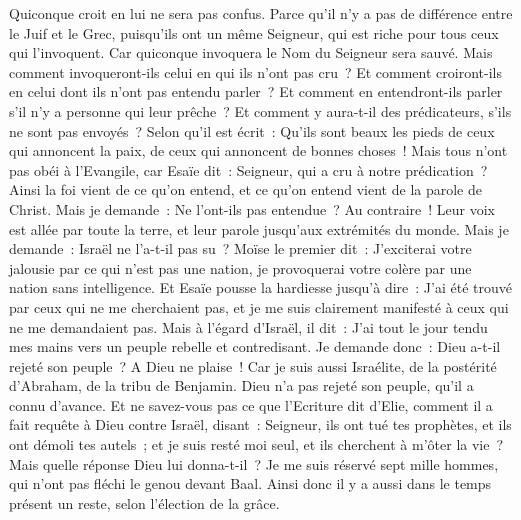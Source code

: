 \begin{multicols}{2}
Quiconque croit en lui ne sera pas confus.
Parce qu'il n'y a pas de différence entre le Juif et le Grec, puisqu'ils ont un même Seigneur, qui est riche pour tous ceux qui l'invoquent.
Car quiconque invoquera le Nom du Seigneur sera sauvé.
Mais comment invoqueront-ils celui en qui ils n'ont pas cru~? Et comment croiront-ils en celui dont ils n'ont pas entendu parler~? Et comment en entendront-ils parler s'il n'y a personne qui leur prêche~?
Et comment y aura-t-il des prédicateurs, s'ils ne sont pas envoyés~? Selon qu'il est écrit~: Qu'ils sont beaux les pieds de ceux qui annoncent la paix, de ceux qui annoncent de bonnes choses~!
Mais tous n'ont pas obéi à l'Evangile, car Esaïe dit~: Seigneur, qui a cru à notre prédication~?
Ainsi la foi vient de ce qu'on entend, et ce qu'on entend vient de la parole de Christ.
Mais je demande~: Ne l'ont-ils pas entendue~? Au contraire~! Leur voix est allée par toute la terre, et leur parole jusqu'aux extrémités du monde.
Mais je demande~: Israël ne l'a-t-il pas su~? Moïse le premier dit~: J'exciterai votre jalousie par ce qui n'est pas une nation, je provoquerai votre colère par une nation sans intelligence.
Et Esaïe pousse la hardiesse jusqu'à dire~: J'ai été trouvé par ceux qui ne me cherchaient pas, et je me suis clairement manifesté à ceux qui ne me demandaient pas.
Mais à l'égard d'Israël, il dit~: J'ai tout le jour tendu mes mains vers un peuple rebelle et contredisant.
\VerseOne{}Je demande donc~: Dieu a-t-il rejeté son peuple~? A Dieu ne plaise~! Car je suis aussi Israélite, de la postérité d'Abraham, de la tribu de Benjamin.
Dieu n'a pas rejeté son peuple, qu'il a connu d'avance. Et ne savez-vous pas ce que l'Ecriture dit d'Elie, comment il a fait requête à Dieu contre Israël, disant~:
Seigneur, ils ont tué tes prophètes, et ils ont démoli tes autels~; et je suis resté moi seul, et ils cherchent à m'ôter la vie~?
Mais quelle réponse Dieu lui donna-t-il~? Je me suis réservé sept mille hommes, qui n'ont pas fléchi le genou devant Baal.
Ainsi donc il y a aussi dans le temps présent un reste, selon l'élection de la grâce.

\end{multicols}
